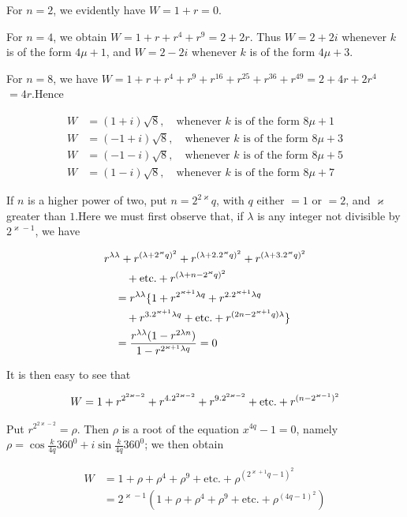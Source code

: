 For $n=2$, we evidently have $W=1+r=0$.

For $n=4$, we obtain $W=1+r+r^4+r^9=2+2r$. Thus $W=2+2i$ whenever $k$ is of the form $4\mu+1$, and $W=2-2i$ whenever $k$ is of the form $4\mu+3$.

For $n=8$, we have $W=1+r+r^4+r^9+r^{16}+r^{25}+r^{36}+r^{49}=2+4r+2r^4$ $=4r$.\quad Hence

\[
\begin{aligned}
W&=(1+i)\surd8,\quad\text{whenever }k\text{ is of the form }8\mu+1\\
W&=(-1+i)\surd8,\quad\text{whenever }k\text{ is of the form }8\mu+3\\
W&=(-1-i)\surd8,\quad\text{whenever }k\text{ is of the form }8\mu+5\\
W&=(1-i)\surd8,\quad\text{whenever }k\text{ is of the form }8\mu+7
\end{aligned}
\]

If $n$ is a higher power of two, put $n=2^{2\varkappa}q$, with $q$ either $=1$ or $=2$, and $\varkappa$ greater than $1$.\quad Here we must first observe that, if $\lambda$ is any integer not divisible by $2^{\varkappa-1}$, we have

\[
\begin{aligned}
&r^{\lambda\lambda}+r^{(\lambda+2^\varkappa q)^2}+r^{(\lambda+2\mathbin{.}2^\varkappa q)^2}+r^{(\lambda+3\mathbin{.}2^\varkappa q)^2}\\&\qquad+\text{etc.}+r^{(\lambda+n-2^\varkappa q)^2}\\
&\quad=r^{\lambda\lambda}\{1+r^{2^{\varkappa+1}\lambda q}+r^{2\mathbin{.}2^{\varkappa+1}\lambda q}\\&\qquad+r^{3\mathbin{.}2^{\varkappa+1}\lambda q}+\text{etc.}+r^{(2n-2^{\varkappa+1}q)\lambda}\}\\&\quad=\frac{r^{\lambda\lambda}(1-r^{2\lambda n})}{1-r^{2^{\varkappa+1}\lambda q}}=0
\end{aligned}
\]

It is then easy to see that

\[
\begin{aligned}
W=1+r^{2^{2\varkappa-2}}+r^{4\mathbin{.}2^{2\varkappa-2}}+r^{9\mathbin{.}2^{2\varkappa-2}}+\text{etc.}+r^{(n-2^{\varkappa-1})^2}
\end{aligned}
\]


Put $r^{2^{2\varkappa-2}}=\rho$. Then $\rho$ is a root of the equation $x^{4q}-1=0$, namely $\rho=\cos\frac{k}{4q}360^0+i\sin\frac{k}{4q}360^0$; we then obtain

\[
\begin{aligned}
W&=1+\rho+\rho^4+\rho^9+\text{etc.}+\rho^{(2^{\varkappa+1}q-1)^2}\\
&=2^{\varkappa-1}(1+\rho+\rho^4+\rho^9+\text{etc.}+\rho^{(4q-1)^2})
\end{aligned}
\]

